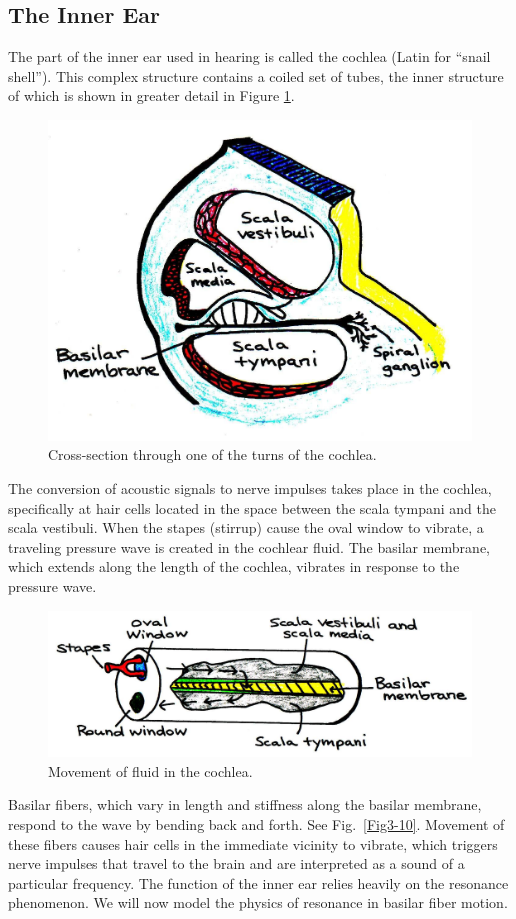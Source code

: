 \subsection{The Inner Ear}

The part of the inner ear used in hearing is called the cochlea (Latin for ``snail shell'').  This complex structure contains a coiled set of tubes, the inner structure of which is shown in greater detail in Figure \ref{Fig3-8}.  
 \begin{figure}[htb]
	\centering
	\includegraphics[width=5in]{./figures/Topic3/Fig3-8.jpg}
	\caption{Cross-section through one of the turns of the cochlea. }
 	\label{Fig3-8}
\end{figure}   
The conversion of acoustic signals to nerve impulses takes place in the cochlea, specifically at hair cells located in the space between the scala tympani and the scala vestibuli.  When the stapes (stirrup) cause the oval window to vibrate, a traveling pressure wave is created in the cochlear fluid.  The basilar membrane, which extends along the length of the cochlea, vibrates in response to the pressure wave.  
\begin{figure}[htb]
	\centering
	\includegraphics[width=\textwidth]{./figures/Topic3/Fig3-9.jpg}
	\caption{Movement of fluid in the cochlea.}
 	\label{Fig3-9}
\end{figure}
Basilar fibers, which vary in length and stiffness along the basilar membrane, respond to the wave by bending back and forth.  See Fig.~\ref{Fig3-10}. Movement of these fibers causes hair cells in the immediate vicinity to vibrate, which triggers nerve impulses that travel to the brain and are interpreted as a sound of a particular frequency. The function of the inner ear relies heavily on the resonance phenomenon. We will now model the physics of resonance in basilar fiber motion.  

